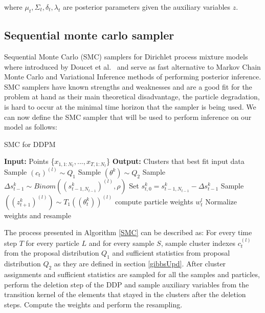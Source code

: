 \documentclass [twoside,hidelinks]{article}
\begin{document}
where $\mu_t, \Sigma_t, \delta_t,  \lambda_t$  are posterior parameters given the auxiliary variables $z$.

\subsection{Sequential monte carlo sampler}
\label{smcsampler}
Sequential Monte Carlo (SMC) samplers for Dirichlet process mixture models where introduced by Doucet et al.~\cite{doucet} and serve as fast alternative to Markov Chain Monte Carlo and Variational Inference methods of performing posterior inference. SMC samplers have known strengths and weaknesses and are a good fit for the problem at hand as their main theoretical disadvantage, the particle degradation, is hard to occur at the minimal time horizon that the sampler is being used. We can now define the SMC sampler that will be used to perform inference on our model as follows:

\begin{algorithm} [ht!]
  \caption{SMC for DDPM}\label{SMC}
  \begin{algorithmic} [1]
	\State \textbf{Input:} Points \{$x_{1,1:N_t}, ..., x_{T,1:N_t}$\}
	\State \textbf{Output:} Clusters that best fit input data
								\State Sample $ (c_t)^{ (l)} \sim Q_1$  
								\State Sample $ (\theta^k ) \sim Q_2$
						    \EndFor		
			   \State Sample $\Delta s_{t-1}^k \sim Binom (  (s_{t-1,N_{t-1}}^k)^{ (l)}, \rho) $ 
		       \State Set $s_{t,0}^{k} = s_{t-1,N_{t-1}}^{k} -\Delta s_{t-1}^k$
   		       \State Sample $ (  (z_{t+1}^k)^{ (l)} ) \sim T_1 ( (\theta_t^k))^{ (l)} $
		    \EndFor
		 	\State compute particle weights $w_t^l$
		    \EndFor
    \State Normalize weights and resample
    \EndFor
  \end{algorithmic}
\end{algorithm}

The process presented in Algorithm \ref{SMC} can be described as:
For every time step $T$ for every particle $L$ and for every sample $S$, sample cluster indexes $c_t^{ (l)}$ from the proposal distribution $Q_1$ and sufficient statistics from proposal distribution $Q_2$ as they are defined in section \ref{gibbsUpd}. After cluster assignments and sufficient statistics are sampled for all the samples and particles, perform the deletion step of the DDP and sample auxiliary variables from the transition kernel of the elements that stayed in the clusters after the deletion steps. Compute the weights and perform the resampling. 
\end{document}
